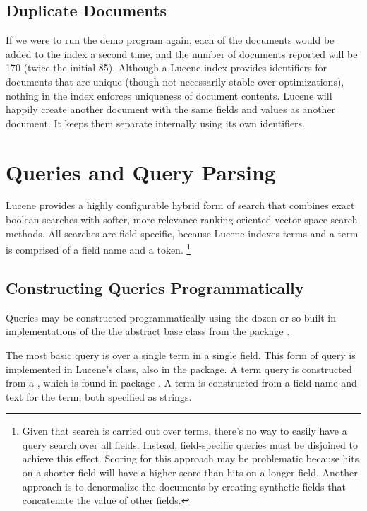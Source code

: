\subsection{Duplicate Documents}

If we were to run the demo program again, each of the documents would
be added to the index a second time, and the number of documents
reported will be 170 (twice the initial 85).  Although a Lucene index
provides identifiers for documents that are unique (though not
necessarily stable over optimizations), nothing in the index enforces
uniqueness of document contents.  Lucene will happily create another
document with the same fields and values as another document.  It
keeps them separate internally using its own identifiers.

\section{Queries and Query Parsing}

Lucene provides a highly configurable hybrid form of search that
combines exact boolean searches with softer, more
relevance-ranking-oriented vector-space search methods.  
All searches are field-specific, because Lucene indexes terms and 
a term is comprised of a field name and a token.%
%
\footnote{Given that search is carried out over terms, 
 there's no way to easily have a query search over all fields.
 Instead, field-specific queries must be disjoined to achieve this
 effect.  Scoring for this approach may be problematic because
 hits on a shorter field  will have a higher score than hits on a longer field.
 Another approach is to denormalize the documents by creating
 synthetic fields that concatenate the value of other fields.}
%

\subsection{Constructing Queries Programmatically}

Queries may be constructed programmatically using the dozen or so
built-in implementations of the the  abstract base class
from the package .  

The most basic query is over a single term in a single field.  This
form of query is implemented in Lucene's  class, also
in the  package.  A term query is constructed from a
, which is found in package .
A term is constructed from a field name and text for the term, both
specified as strings.


